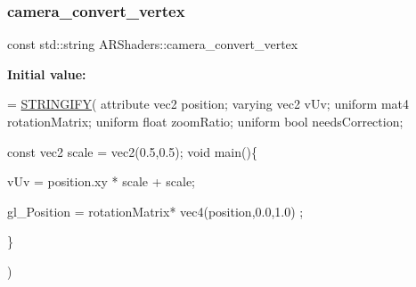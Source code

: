 \subsubsection{\texorpdfstring{camera\+\_\+convert\+\_\+vertex}{camera\_convert\_vertex}}
{\footnotesize\ttfamily const std\+::string A\+R\+Shaders\+::camera\+\_\+convert\+\_\+vertex}

{\bfseries Initial value\+:}
\begin{DoxyCode}
= \hyperlink{_a_r_shaders_8h_ab06e1eb2e9bf38e0d452b1f796aed208}{STRINGIFY}(
                                                    attribute vec2 position;
                                                    varying vec2 vUv;
                                                    uniform mat4 rotationMatrix;
                                                    uniform \textcolor{keywordtype}{float} zoomRatio;
                                                    uniform \textcolor{keywordtype}{bool} needsCorrection;
                                                    
                                                    \textcolor{keyword}{const} vec2 scale = vec2(0.5,0.5);
                                                    \textcolor{keywordtype}{void} main()\{
                                                       
                                                        
                                                        vUv = position.xy * scale + scale;
                                                        
                               
                                                        
                                                       gl\_Position = rotationMatrix* vec4(position,0.0,1.0)
      ;
                                                    
                                                        
                                                        
                                                    \}
                                                    
                                                    
                                                    )
\end{DoxyCode}
\mbox{\label{namespace_a_r_shaders_ad415abff7a73d38ae981dd4be29a7076}} 
